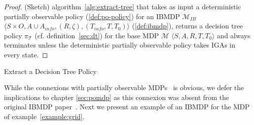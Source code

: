 \begin{proof}(Sketch) algorithm~\ref{alg:extract-tree} that takes as input a deterministic partially observable policy (\ref{def:po-policy}) for an IBMDP $\mathcal{M}_{IB}$ $\langle S \times O,A \cup A_{info}, (R, \zeta), (T_{info}, T, T_0)\rangle$ (\ref{def:ibmdp}), returns a decision tree policy $\pi_{\mathcal{T}}$ (cf. definition~\ref{sec:dt}) for the base MDP $\mathcal{M}$ $\langle S, A, R, T, T_0\rangle$ and always terminates unless the deterministic partially observable policy takes IGAs in every state.
\end{proof}

\begin{algorithm}[t]
    
    
    \caption{Extract a Decision Tree Policy}\label{alg:extract-tree}
\end{algorithm}

While the connexions with partially observable MDPs~\cite{POMDP,chap2} is obvious, we defer the implications to chapter \ref{sec:pomdp} as this connexion was absent from the original IBMDP paper~\cite{topin2021iterative}.
Next we present an example of an IBMDP for the MDP of example~\ref{example:grid}.

